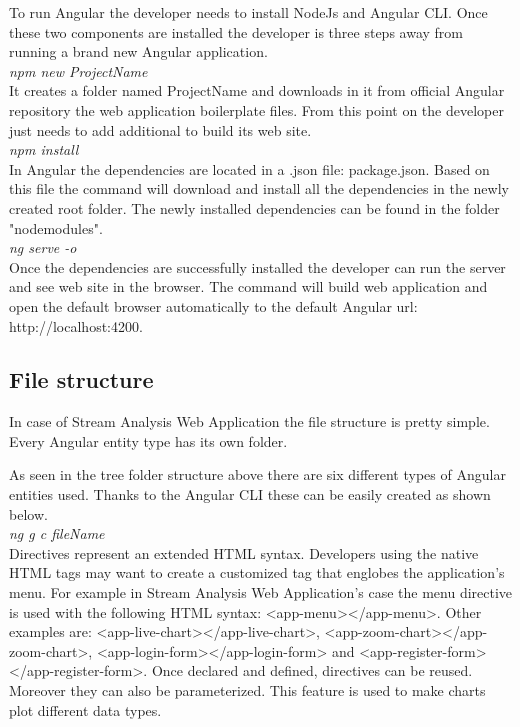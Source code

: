 To run Angular the developer needs to install NodeJs and Angular CLI. Once these two components are installed the developer is three steps away from running a brand new Angular application.\\

\textit{npm new ProjectName}\\

It creates a folder named ProjectName and downloads in it from official Angular repository the web application boilerplate files. From this point on the developer just needs to add additional to build its web site.\\

\textit{npm install}\\

In Angular the dependencies are located in a .json file: package.json. Based on this file the command will download and install all the dependencies in the newly created root folder. The newly installed dependencies can be found in the folder "nodemodules".\\

\textit{ng serve -o}\\

Once the dependencies are successfully installed the developer can run the server and see web site in the browser. The command will build web application and open the default browser automatically to the default Angular url: http://localhost:4200.\\

\subsection{File structure}
\label{chap:04:01:02}

In case of Stream Analysis Web Application the file structure is pretty simple. Every Angular entity type has its own folder.\\


As seen in the tree folder structure above there are six different types of Angular entities used. Thanks to the Angular CLI these can be easily created as shown below.\\

\textit{ng g c fileName}\\

Directives represent an extended HTML syntax. Developers using the native HTML tags may want to create a customized tag that englobes the application's menu. For example in Stream Analysis Web Application's case the menu directive is used with the following HTML syntax: <app-menu></app-menu>. Other examples are: <app-live-chart></app-live-chart>, <app-zoom-chart></app-zoom-chart>, <app-login-form></app-login-form> and <app-register-form></app-register-form>. Once declared and defined, directives can be reused. Moreover they can also be parameterized. This feature is used to make charts plot different data types.\\

